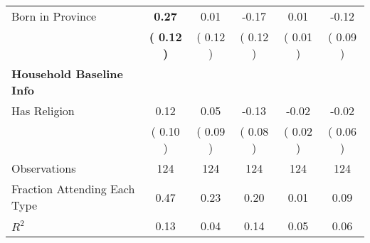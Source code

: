 \begin{table}[H]
{\begin{tabular}{lccccc}
\quad Born in Province & \textbf{     0.27} &      0.01 &     -0.17 &      0.01 &     -0.12 \\
\quad  & \textbf{(     0.12 )} & (     0.12 )  & (     0.12 )  & (     0.01 ) & (     0.09 ) \\
\midrule
\textbf{Household Baseline Info} \\
\quad Has Religion &      0.12 &      0.05 &     -0.13 &     -0.02 &     -0.02 \\
\quad  & (     0.10 ) & (     0.09 )  & (     0.08 )  & (     0.02 ) & (     0.06 ) \\
\midrule
Observations & 124 & 124 & 124 & 124 & 124 \\
Fraction Attending Each Type &      0.47 &      0.23 &      0.20 &      0.01 &      0.09 \\
\midrule
$ R^2$ &      0.13 &      0.04 &      0.14 &      0.05 &      0.06 \\
\bottomrule
\end{tabular}}
\end{table}
